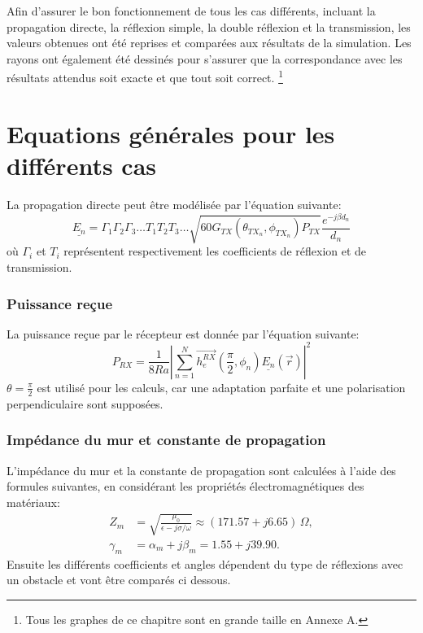 Afin d'assurer le bon fonctionnement de tous les cas différents, incluant la propagation directe, la réflexion simple, la double réflexion et la transmission, les valeurs obtenues ont été reprises et comparées aux résultats de la simulation. Les rayons ont également été dessinés pour s'assurer que la correspondance avec les résultats attendus soit exacte et que tout soit correct. \footnote{Tous les graphes de ce chapitre sont en grande taille en Annexe A.}


\section{Equations générales pour les différents cas}
La propagation directe peut être modélisée par l'équation suivante:
\begin{equation}
\underline{E_n} = \Gamma_1 \Gamma_2 \Gamma_3 \ldots T_1 T_2 T_3 \ldots \sqrt{60 G_{TX}(\theta_{TX_n},\phi_{TX_n}) P_{TX}} \frac{e^{-j\beta d_n}}{d_n}
\end{equation}
où $\Gamma_i$ et $T_i$ représentent respectivement les coefficients de réflexion et de transmission.

\subsubsection{Puissance reçue}
La puissance reçue par le récepteur est donnée par l'équation suivante:
\begin{equation}
P_{RX} = \frac{1}{8Ra} \left|\sum_{n=1}^{N} \vec{h_e^{RX}}\left(\frac{\pi}{2}, \phi_n\right) \underline{E_n}(\vec{r})\right|^2
\end{equation}
$\theta = \frac{\pi}{2}$ est utilisé pour les calculs, car une adaptation parfaite et une polarisation perpendiculaire sont supposées.

\subsubsection{Impédance du mur et constante de propagation }
L'impédance du mur et la constante de propagation sont calculées à l'aide des formules suivantes, en considérant les propriétés électromagnétiques des matériaux:
\begin{align}
Z_m &= \sqrt{\frac{\mu_0}{\epsilon - j\sigma/\omega}} \approx (171.57 + j6.65) \, \Omega, \\
\gamma_m &= \alpha_m + j\beta_m = 1.55 + j39.90.
\end{align}
Ensuite les différents coefficients et angles dépendent du type de réflexions avec un obstacle et vont être comparés ci dessous.

